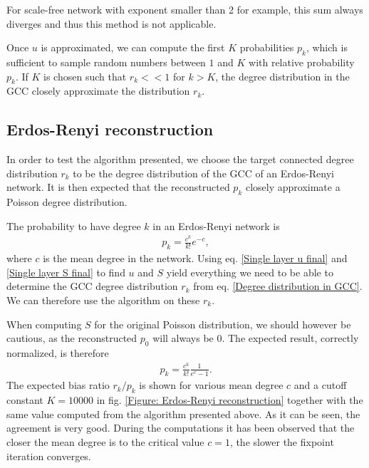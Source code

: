 \documentclass[
11pt, %
english, %
singlespacing, %
nolistspacing, %
liststotoc, %
headsepline, %
]{MastersDoctoralThesis} %
\begin{document}
For scale-free network with exponent smaller than 2 for example, this sum always diverges and thus this method is not applicable.

Once $u$ is approximated, we can compute the first $K$ probabilities $p_k$, which is sufficient to sample random numbers between $1$ and $K$ with relative probability $p_k$. If $K$ is chosen such that $r_k << 1$ for $k > K$, the degree distribution in the GCC closely approximate the distribution $r_k$.

\subsection{Erdos-Renyi reconstruction}

In order to test the algorithm presented, we choose the target connected degree distribution $r_k$ to be the degree distribution of the GCC of an Erdos-Renyi network. It is then expected that the reconstructed $p_k$ closely approximate a Poisson degree distribution.

The probability to have degree $k$ in an Erdos-Renyi network is
\begin{align}
	p_k = \frac{c^k}{k!} e^{-c},
\end{align}
where $c$ is the mean degree in the network. Using eq. \eqref{Single layer u final} and \eqref{Single layer S final} to find $u$ and $S$ yield everything we need to be able to determine the GCC degree distribution $r_k$ from eq. \eqref{Degree distribution in GCC}. We can therefore use the algorithm on these $r_k$.

When computing $S$ for the original Poisson distribution, we should however be cautious, as the reconstructed $p_0$ will always be $0$. The expected result, correctly normalized, is therefore
\begin{align}
	p_k = \frac{c^k}{k!} \frac{1}{e^{c} - 1}.
\end{align}
The expected bias ratio $r_k/p_k$ is shown for various mean degree $c$ and a cutoff constant $K = 10000$ in fig. \ref{Figure: Erdos-Renyi reconstruction} together with the same value computed from the algorithm presented above. As it can be seen, the agreement is very good. During the computations it has been observed that the closer the mean degree is to the critical value $c = 1$, the slower the fixpoint iteration converges.
\end{document}
